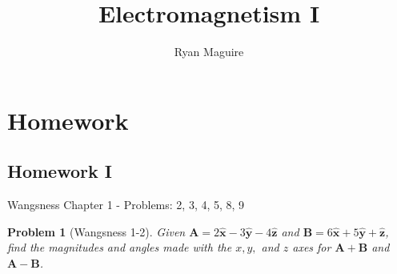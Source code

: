 \documentclass{article}
\title{Electromagnetism I}
\author{Ryan Maguire}
\date{\vspace{-5ex}}
\theoremstyle{mystyle}
\newtheorem{problem}{Problem}[section]
\begin{document}
\maketitle
\tableofcontents
%
\section{Homework}
\subsection{Homework I}
Wangsness Chapter 1 - Problems: 2, 3, 4, 5, 8, 9
\begin{problem}[Wangsness 1-2]
Given $\mathbf{A} = 2\hat{\mathbf{x}}-3\hat{\mathbf{y}}-4\hat{\mathbf{z}}$ and $\mathbf{B} = 6\hat{\mathbf{x}}+5\hat{\mathbf{y}}+\hat{\mathbf{z}}$, find the magnitudes and angles made with the $x,y,$ and $z$ axes for $\mathbf{A}+\mathbf{B}$ and $\mathbf{A}-\mathbf{B}$.
\end{problem}
\end{document}
